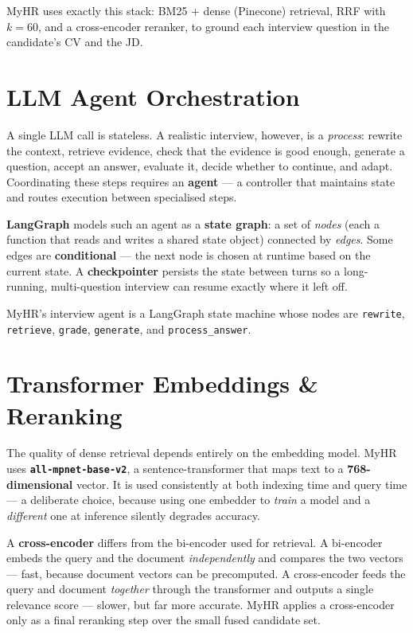\documentclass[12pt,a4paper,oneside]{report}
\begin{document}
MyHR uses exactly this stack: BM25 + dense (Pinecone) retrieval, RRF with $k = 60$, and a
cross-encoder reranker, to ground each interview question in the candidate's CV and the JD.

\section{LLM Agent Orchestration}

A single LLM call is stateless. A realistic interview, however, is a \textit{process}: rewrite
the context, retrieve evidence, check that the evidence is good enough, generate a question,
accept an answer, evaluate it, decide whether to continue, and adapt. Coordinating these steps
requires an \textbf{agent} --- a controller that maintains state and routes execution between
specialised steps.

\textbf{LangGraph} models such an agent as a \textbf{state graph}: a set of \textit{nodes}
(each a function that reads and writes a shared state object) connected by \textit{edges}. Some
edges are \textbf{conditional} --- the next node is chosen at runtime based on the current
state. A \textbf{checkpointer} persists the state between turns so a long-running,
multi-question interview can resume exactly where it left off.

MyHR's interview agent is a LangGraph state machine whose nodes are \texttt{rewrite},
\texttt{retrieve}, \texttt{grade}, \texttt{generate}, and \texttt{process\_answer}.

\section{Transformer Embeddings \& Reranking}

The quality of dense retrieval depends entirely on the embedding model. MyHR uses
\textbf{\texttt{all-mpnet-base-v2}}, a sentence-transformer that maps text to a
\textbf{768-dimensional} vector. It is used consistently at both indexing time and query time
--- a deliberate choice, because using one embedder to \textit{train} a model and a
\textit{different} one at inference silently degrades accuracy.

A \textbf{cross-encoder} differs from the bi-encoder used for retrieval. A bi-encoder embeds
the query and the document \textit{independently} and compares the two vectors --- fast, because
document vectors can be precomputed. A cross-encoder feeds the query and document
\textit{together} through the transformer and outputs a single relevance score --- slower, but
far more accurate. MyHR applies a cross-encoder only as a final reranking step over the small
fused candidate set.
\end{document}
